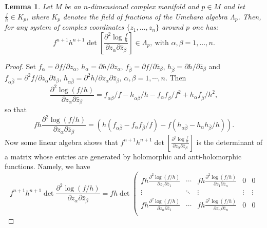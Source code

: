 \documentclass[12pt]{amsart}
\newtheorem{lem}[theor]{Lemma}
\begin{document}
\begin{lem}\label{umeharaimp}
Let $M$ be  an $n$-dimensional complex manifold and  $p\in M$ 
and let $\frac{f}{h}\in K_p$, where $K_p$ denotes the field of fractions of the Umehara algebra 
$\Lambda_p$. Then,  for any system of complex coordinates $\{z_1, \dots ,z_n\}$ around $p$ one has:
$$f^{n+1}h^{n+1}\det\left[\frac{\partial^2\log\frac{f}{h}}{\partial z_{\alpha}\partial\bar z_{\beta}}\right]\in \Lambda_p, \ \mbox{with } \alpha, \beta =1, \dots , n.$$
\end{lem}
\begin{proof}
Set  $f_\alpha=\partial f / \partial z_\alpha$, $h_\alpha=\partial h / \partial z_\alpha$, $f_{\bar{\beta}}=\partial f / \partial \bar{z}_\beta$, $h_{\bar{\beta}}=\partial h / \partial \bar{z}_\beta$ and 
$f_{\alpha \bar{\beta}}=\partial^2 f / \partial z_\alpha \partial \bar{z}_\beta$, $h_{\alpha \bar{\beta}}=\partial^2 h / \partial z_\alpha \partial \bar{z}_\beta$, $\alpha, \beta =1, \cdots, n$. Then
\begin{equation*}
\frac{\partial^2 \log(f/h)}{\partial z_\alpha \partial \bar{z}_\beta}
=  f_{\alpha \bar{\beta}} / f
- h_{\alpha \bar{\beta}} / h
-f_\alpha f_{\bar{\beta}} / f^2
+h_\alpha f_{\bar{\beta}} / h^2,
\end{equation*}
so that 
\begin{equation}\label{EqMatrixEntry}
fh	\frac{\partial^2 \log(f/h)}{\partial z_\alpha \partial \bar{z}_\beta}
	= \left(h\left(f_{\alpha \bar{\beta}} -f_\alpha f_{\bar{\beta}} / f\right)  -f\left(h_{\alpha \bar{\beta}}- h_\alpha h_{\bar{\beta}} / h\right)\right) .
\end{equation}
Now some linear algebra shows that  $f^{n+1}h^{n+1}\det\left[\frac{\partial^2\log\frac{f}{h}}{\partial z_{\alpha}\partial\bar z_{\beta}}\right]$ is the determinant of a matrix whose entries are generated by holomorphic and anti-holomorphic functions.
Namely, we have
\begin{equation*}
f^{n+1}h^{n+1} \operatorname{det}\frac{\partial^2 \log(f/h)}{\partial z_\alpha \partial \bar{z}_\beta}
=fh \operatorname{det}\left(\begin{array}{ccccc}
	fh\frac{\partial^2 \log(f/h)}{\partial z_1 \partial \bar{z}_1}& \cdots & fh\frac{\partial^2 \log(f/h)}{\partial z_1 \partial \bar{z}_n}& 0 & 0\\
	\vdots & \ddots & \vdots& \vdots & \vdots \\
	fh\frac{\partial^2 \log(f/h)}{\partial z_n \partial \bar{z}_1}& \cdots & fh\frac{\partial^2 \log(f/h)}{\partial z_n \partial \bar{z}_n}& 0 & 0\\

\end{array}
\end{equation*}
\end{proof}
\end{document}

